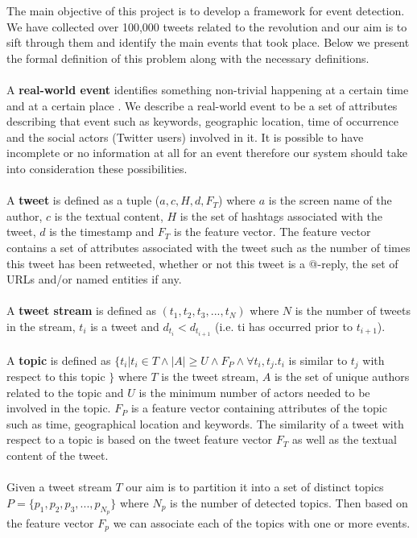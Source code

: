 The main objective of this project is to develop a framework for event detection. We have collected over 100,000 tweets related to the revolution and our aim is to sift through them and identify the main events that took place. Below we present the formal definition of this problem along with the necessary definitions.\\\\
A \textbf{real-world event} identifies something non-trivial happening at a certain time and at a certain place \cite{Yang99learningapproaches}. We describe a real-world event to be a set of attributes describing that event such as keywords, geographic location, time of occurrence and the social actors (Twitter users) involved in it. It is possible to have incomplete or no information at all for an event therefore our system should take into consideration these possibilities.\\\\
A \textbf{tweet} is defined as a tuple ($a, c, H, d, F_T$) where \boldmath  $a$ \unboldmath is the screen name of the author, \boldmath $c$  \unboldmath is the textual content, $H$ is the set of hashtags associated with the tweet, \boldmath $d$ \unboldmath is the timestamp and $F_T$ is the feature vector.  The feature vector contains a set of attributes associated with the tweet such as the number of times this tweet has been retweeted, whether or not this tweet is a @-reply, the set of URLs and/or named entities if any.\\\\
A \textbf{tweet stream} is defined as $(t_1, t_2, t_3,..., t_N)$ where $N$ is the number of tweets in the stream, $t_i$ is a tweet and $d_{t_i} < d_{t_{i+1}}$ (i.e. ti has occurred prior to $t_{i+1}$).\\\\
A \textbf{topic} is defined as $ \{t_i | t_i \in T \wedge |A| \geq U \wedge F_P \wedge \forall t_i, t_j. t_i$ is similar to $t_j$ with respect to this topic $\}$ where $T$ is the tweet stream, $A$ is the set of unique authors related to the topic and $U$ is the minimum number of actors needed to be involved in the topic. $F_P$ is a feature vector containing attributes of the topic such as time, geographical location and keywords. The similarity of a tweet with respect to a topic is based on the tweet feature vector $F_T$ as well as the textual content of the tweet.\\\\
Given a tweet stream $T$ our aim is to partition it into a set of distinct topics $P = \{p_1, p_2, p_3,..., p_{N_p}\}$ where $N_p$ is the number of detected topics. Then based on the feature vector $F_p$ we can associate each of the topics with one or more events.   

